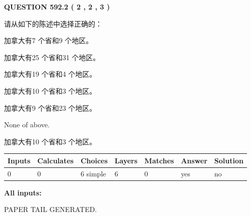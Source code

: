 \documentclass{ctexart}
\begin{document}
   
  
\vspace{0.2in}
  
{\textbf{\Large{QUESTION
592.2 
 ( 2 , 2 , 3 )
}}}
  
  
请从如下的陈述中选择正确的：
 
 
加拿大有7 个省和9 个地区。
 
 
加拿大有25 个省和31 个地区。
 
 
加拿大有19 个省和4 个地区。
 
 
加拿大有10 个省和3 个地区。
 
 
加拿大有9 个省和23 个地区。
 
 
 None of above.
 
 
\noindent{}
 
 
加拿大有10 个省和3 个地区。
 
 
\noindent{}
 
 
   
   
   
   
\noindent\begin{tabular}{|l|l|l|l|l|l|l|}
 \hline
Inputs & Calculates & Choices & Layers & Matches & Answer & Solution \\ \hline
 0  & 
 0  & 
 6
  simple  
  & 
 6  & 
 0  & 
  yes & 
  no 
  \\ \hline
 \end{tabular}
   
   
   
   
\noindent{}
   
   
   
   
\noindent\vspace{0.1in}\hspace{-0.08in} {\textbf{\Large{All inputs: }}}
   
   
   
   
   
   
 \vspace{0.2in}
 
   
   
\vspace{2.0in} PAPER TAIL GENERATED.
   
\end{document}
